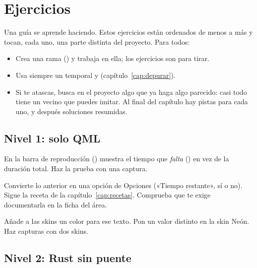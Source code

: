 \chapter{Ejercicios}
\label{cap:ejercicios}

Una guía se aprende haciendo. Estos ejercicios están ordenados de menos a más y tocan, cada
uno, una parte distinta del proyecto. Para todos:

\begin{itemize}
  \item Crea una rama () y trabaja en ella; los
  ejercicios son para tirar.
  \item Usa siempre un  temporal y 
  (capítulo~\ref{cap:depurar}).
  \item Si te atascas, busca en el proyecto algo que ya haga algo parecido: casi todo tiene un
  vecino que puedes imitar. Al final del capítulo hay pistas para cada uno, y después soluciones
  resumidas.
\end{itemize}

\section{Nivel 1: solo QML}

\begin{ejercicio}
En la barra de reproducción () muestra el tiempo que \emph{falta}
() en vez de la duración total. Haz la prueba con una captura.
\end{ejercicio}

\begin{ejercicio}
Convierte lo anterior en una opción de Opciones («Tiempo restante», sí o no). Sigue la receta
de la capítulo~\ref{cap:recetas}. Comprueba que  te exige documentarla en la
ficha del área.
\end{ejercicio}

\begin{ejercicio}
Añade a las skins un color  para ese texto. Pon un valor distinto en la skin Neón.
Haz capturas con dos skins.
\end{ejercicio}

\section{Nivel 2: Rust sin puente}

